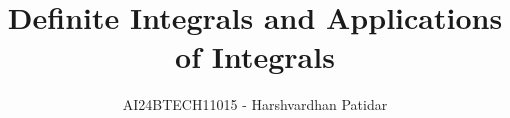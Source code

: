\documentclass[journal]{IEEEtran}
\begin{document}

\vspace{3cm}

\title{Definite Integrals and Applications of Integrals}
\author{AI24BTECH11015 - Harshvardhan Patidar}
 \maketitle
{\let\newpage\relax\maketitle}

\renewcommand{\thefigure}{\theenumi}
\renewcommand{\thetable}{\theenumi}
\setlength{\intextsep}{10pt} %


\renewcommand{\thetable}{\theenumi}



\end{document}
